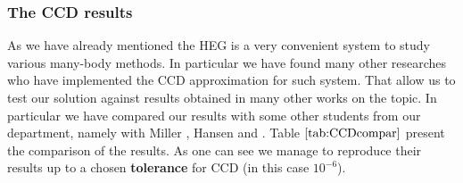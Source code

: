 \documentclass[twoside,english]{uiofysmaster}
\theoremstyle{definition}
\begin{document}
\subsubsection{The CCD results}
As we have already mentioned the HEG is a very convenient system to study various many-body methods. In particular we have found many other researches who have implemented the CCD approximation for such system. That allow us to test our solution against results obtained in many other works on the topic. In particular we have compared our results with some other students from our department, namely with Miller \cite{millerAntumMechanicalStudies}, Hansen \cite{hansenCoupledClusterStudies} and \cite{gustavbaardsenCoupledclusterTheoryInfinite2014}. Table $\ref{tab:CCDcompar}$ present the comparison of the results. As one can see we manage to reproduce their results up to a chosen \textbf{tolerance} for CCD (in this case $10^{-6}$).
\end{document}
